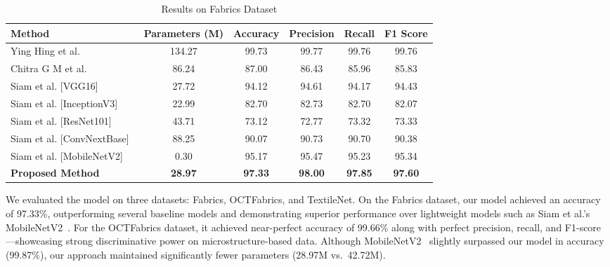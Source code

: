 \vspace{-0.90em}
\begin{table}[h]
\centering
\caption{Results on Fabrics Dataset}
\label{tab:rgb_results}
\begin{adjustbox}{max width=\textwidth}
\begin{tabular}{lccccc}
\toprule
\textbf{Method} & \textbf{Parameters (M)} & \textbf{Accuracy} & \textbf{Precision} & \textbf{Recall} & \textbf{F1 Score} \\
\midrule
Ying Hing et al.~\cite{hong2024research} & 134.27 & 99.73 & 99.77 & 99.76 & 99.76 \\
Chitra G M et al.~\cite{chitra2023fabric} & 86.24 & 87.00 & 86.43 & 85.96 & 85.83 \\
Siam et al. [VGG16]~\cite{siam2023textilenet} & 27.72 & 94.12 & 94.61 & 94.17 & 94.43 \\
Siam et al. [InceptionV3]~\cite{siam2023textilenet} & 22.99 & 82.70 & 82.73 & 82.70 & 82.07 \\
Siam et al. [ResNet101]~\cite{siam2023textilenet} & 43.71 & 73.12 & 72.77 & 73.32 & 73.33 \\
Siam et al. [ConvNextBase]~\cite{siam2023textilenet} & 88.25 & 90.07 & 90.73 & 90.70 & 90.38 \\
Siam et al. [MobileNetV2]~\cite{siam2023textilenet} & 0.30 & 95.17 & 95.47 & 95.23 & 95.34 \\
\textbf{Proposed Method} & \textbf{28.97} & \textbf{97.33} & \textbf{98.00} & \textbf{97.85} & \textbf{97.60} \\
\bottomrule
\end{tabular}
\end{adjustbox}
\end{table}
\vspace{-0.90em}

We evaluated the model on three datasets: Fabrics, OCTFabrics, and TextileNet. On the Fabrics dataset, our model achieved an accuracy of 97.33\%, outperforming several baseline models and demonstrating superior performance over lightweight models such as Siam et al.'s MobileNetV2~\cite{siam2023textilenet}. For the OCTFabrics dataset, it achieved near-perfect accuracy of 99.66\% along with perfect precision, recall, and F1-score—showcasing strong discriminative power on microstructure-based data. Although MobileNetV2~\cite{siam2023textilenet} slightly surpassed our model in accuracy (99.87\%), our approach maintained significantly fewer parameters (28.97M vs.\ 42.72M).

